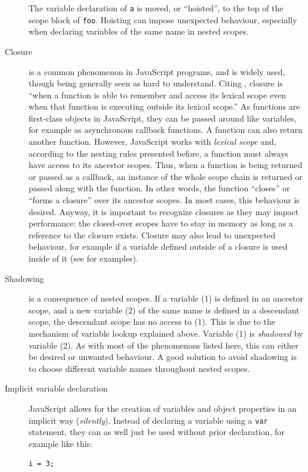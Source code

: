 \begin{description}
The variable declaration of \texttt{a} is moved, or “hoisted”, to the
top of the scope block of \texttt{foo}. Hoisting can impose unexpected
behaviour, especially when declaring variables of the same name in
nested scopes.
\item[Closure]
is a common phenomenon in JavaScript programs, and is widely used,
though being generally seen as hard to understand. Citing
, closure is “when a function is able to remember and
access its lexical scope even when that function is executing outside
its lexical scope.” \citeyear{getify} As functions are first-class
objects in JavaScript, they can be passed around like variables, for
example as asynchronous callback functions. A function can also return
another function. However, JavaScript works with \emph{lexical scope}
and, according to the nesting rules presented before, a function must
always have access to its ancestor scopes. Thus, when a function is
being returned or passed as a callback, an instance of the whole scope
chain is returned or passed along with the function. In other words, the
function “closes” or “forms a closure” over its ancestor scopes. In most
cases, this behaviour is desired. Anyway, it is important to recognize
closures as they may impact performance: the closed-over scopes have to
stay in memory as long as a reference to the closure exists. Closure may
also lead to unexpected behaviour, for example if a variable defined
outside of a closure is used inside of it (see
 for examples).
\item[Shadowing]
is a consequence of nested scopes. If a variable (1) is defined in an
ancestor scope, and a new variable (2) of the same name is defined in a
descendant scope, the descendant scope has no access to (1). This is due
to the mechanism of variable lookup explained above. Variable (1) is
\emph{shadowed} by variable (2). As with most of the phenomenons listed
here, this can either be desired or unwanted behaviour. A good solution
to avoid shadowing is to choose different variable names throughout
nested scopes.
\item[Implicit variable declaration]
JavaScript allows for the creation of variables and object properties in
an implicit way (\emph{silently}). Instead of declaring a variable using
a \texttt{var} statement, they can as well just be used without prior
declaration, for example like this:

\begin{verbatim}
i = 3;
\end{verbatim}


\end{description}
